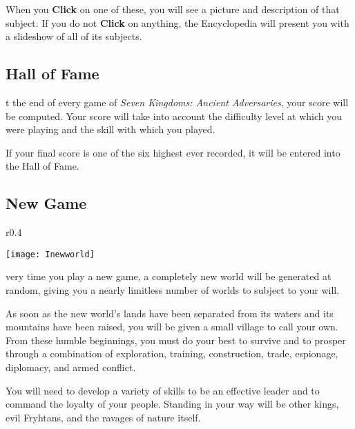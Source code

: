 
When you \textbf{Click} on one of these, you will see a picture and description of that subject. If you do not \textbf{Click} on anything, the Encyclopedia will present you with a slideshow of all of its subjects.

\subsection{\textsf{Hall of Fame}}


t the end of every game of \textit{Seven Kingdoms: Ancient Adversaries}, your score will be computed. Your score will take into account the difficulty level at which you were playing and the skill with which you played.

If your final score is one of the six highest ever recorded, it will be entered into the Hall of Fame.

\subsection{\textsf{New Game}}

\begin{wrapfigure}{r}{0.4\textwidth}
    \begin{center}
        \vspace{-20pt}
        \texttt{[image: Inewworld]} %
    \end{center}
\vspace{-20pt}
\end{wrapfigure}

very time you play a new game, a completely new world will be generated at random, giving you a nearly limitless number of worlds to subject to your will.

As soon as the new world’s lands have been separated from its waters and its mountains have been raised, you will be given a small village to call your own. From these humble beginnings, you must do your best to survive and to prosper through a combination of exploration, training, construction, trade, espionage, diplomacy, and armed conflict.

You will need to develop a variety of skills to be an effective leader and to command the loyalty of your people. Standing in your way will be other kings, evil Fryhtans, and the ravages of nature itself.

